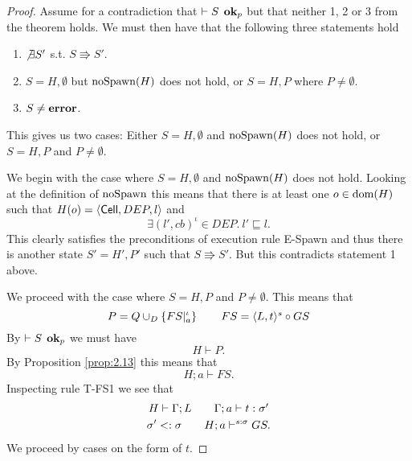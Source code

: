 \begin{proof}
  Assume for a contradiction that $\vdash S \:\: \mbox{{\bf ok}$_p$}$ but that neither 1,
  2 or 3 from the theorem holds. We must then have that the following three
  statements hold
  \begin{enumerate}
    \item $\not\exists S'$ s.t. $S \Rrightarrow S'$.
    \item $S = H, \emptyset$ but $\mbox{$\mathrm{noSpawn}$}(H)$ does not hold, or $S = H, P$
      where $P \neq \emptyset$.
    \item $S \neq \mbox{{\bf error}}$.
  \end{enumerate}
  This gives us two cases: Either $S = H, \emptyset$ and $\mbox{$\mathrm{noSpawn}$}(H)$ does not hold,
  or $S = H, P$ and $P \neq \emptyset$.

  We begin with the case where $S = H, \emptyset$ and $\mbox{$\mathrm{noSpawn}$}(H)$ does not
  hold. Looking at the definition of $\mbox{$\mathrm{noSpawn}$}$ this means that there is at
  least one $o \in \mbox{$\mathrm{dom}$}(H)$ such that $H(o) = \mbox{$\langle \mbox{$\mathsf{Cell}$}{}, DEP, l \rangle$}$ and
  \begin{equation*}
    \exists (l', cb)^\iota \in DEP. \: l' \sqsubseteq l.
  \end{equation*}
  This clearly satisfies the preconditions of execution rule {\sc E-Spawn} and
  thus there is another state $S' = H', P'$ such that $S \Rrightarrow S'$. But
  this contradicts statement 1 above.

  We proceed with the case where $S = H, P$ and $P \neq \emptyset$. This means
  that
  \begin{equation*}
    P = Q \cup_D \left\{ FS|_a^\iota \right\} \quad\quad FS = \mbox{$\langle L, t \rangle^s$} \circ GS
  \end{equation*}
  By $\vdash S \:\: \mbox{{\bf ok}$_p$}$ we must have
  \begin{equation*}
    H \vdash P.
  \end{equation*}
  By Proposition \ref{prop:2.13} this means that 
  \begin{equation*}
    H;a \vdash FS.
  \end{equation*}
  Inspecting rule {\sc T-FS1} we see that
  \begin{equation} \label{eq:prog_tbase}
    \begin{gathered}
      H \vdash \Gamma;L \quad\quad \mbox{$\Gamma;a\vdash t:\sigma'$} \\
      \sigma' <: \sigma \quad\quad H;a \vdash^{s: \sigma} GS.
    \end{gathered}
  \end{equation}
  We proceed by cases on the form of $t$. 
  

\end{proof}
